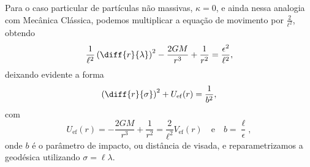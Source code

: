 Para o caso particular de partículas não massivas, \(\kappa = 0\), e ainda nessa analogia com Mecânica Clássica, podemos multiplicar a equação de movimento por \(\frac{2}{\ell^2}\), obtendo
\begin{equation*}
    \frac{1}{\ell^2}\left(\diff{r}{\lambda}\right)^2 - \frac{2GM}{r^3} + \frac{1}{r^2} = \frac{\epsilon^2}{\ell^2},
\end{equation*}
deixando evidente a forma
\begin{equation*}
    \left(\diff{r}{\sigma}\right)^2 + U_\mathrm{ef}(r) = \frac{1}{b^2},
\end{equation*}
com
\begin{equation*}
    U_\mathrm{ef}(r) = - \frac{2GM}{r^3} + \frac{1}{r^2} = \frac{2}{\ell^2}V_\mathrm{ef}(r)\quad\text{e}\quad b = \frac{\ell}{\epsilon},
\end{equation*}
onde \(b\) é o parâmetro de impacto, ou distância de visada, e reparametrizamos a geodésica utilizando \(\sigma = \ell \lambda\).
